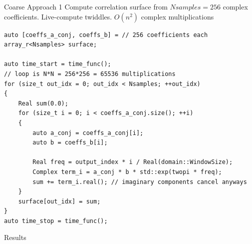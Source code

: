 \begin{frame}[fragile]{Coarse Approach 1}
	Compute correlation surface from $Nsamples=256$ complex coefficients. Live-compute twiddles. $O(n^2)$ complex multiplications
	
	\begin{lstlisting}[basicstyle=\ttfamily\scriptsize, 
		linebackgroundcolor={%
			\ifnum\value{lstnumber}=1 \color{yellow!30}\fi
			\ifnum\value{lstnumber}=14 \color{yellow!30}\fi
			\ifnum\value{lstnumber}=15 \color{yellow!30}\fi
			\ifnum\value{lstnumber}=16 \color{yellow!30}\fi
		}]
auto [coeffs_a_conj, coeffs_b] = // 256 coefficients each
array_r<Nsamples> surface;

auto time_start = time_func();
// loop is N*N = 256*256 = 65536 multiplications
for (size_t out_idx = 0; out_idx < Nsamples; ++out_idx)
{
	Real sum(0.0);
	for (size_t i = 0; i < coeffs_a_conj.size(); ++i)
	{
		auto a_conj = coeffs_a_conj[i];
		auto b = coeffs_b[i];
		
		Real freq = output_index * i / Real(domain::WindowSize);
		Complex term_i = a_conj * b * std::exp(twopi * freq);
		sum += term_i.real(); // imaginary components cancel anyways
	}
	surface[out_idx] = sum;
}
auto time_stop = time_func();
	\end{lstlisting}
	
\end{frame}

\begin{frame}{Results}
\end{frame}


